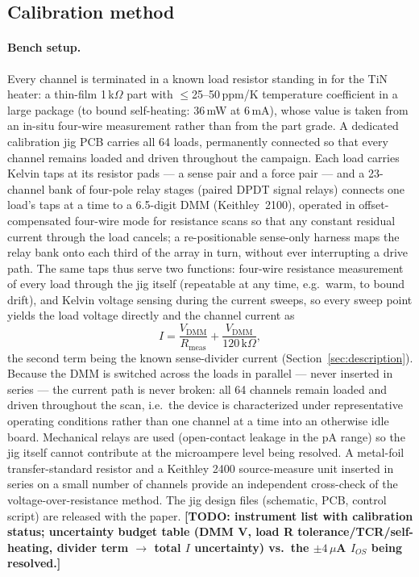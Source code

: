 \documentclass[11pt]{article}
\newif\ifdraft\drafttrue
\newcommand{\todo}[1]{\ifdraft{\color{red}\textbf{[TODO: #1]}}\fi}
\begin{document}
\subsection{Calibration method}
\label{sec:cal-method}

\paragraph{Bench setup.}
Every channel is terminated in a known load resistor standing in for the TiN
heater: a thin-film 1\,k$\Omega$ part with $\le$25--50\,ppm/K temperature
coefficient in a large package (to bound self-heating: 36\,mW at 6\,mA), whose
value is taken from an in-situ four-wire measurement rather than from the part
grade. A dedicated calibration jig PCB carries all 64 loads, permanently
connected so that every channel remains loaded and driven throughout the
campaign. Each load carries Kelvin taps at its resistor pads --- a sense pair
and a force pair --- and a 23-channel bank of four-pole relay stages (paired DPDT signal relays)
connects one load's taps at a time to a 6.5-digit DMM (Keithley~2100),
operated in offset-compensated four-wire mode for resistance scans so that
any constant residual current through the load cancels; a re-positionable
sense-only harness maps the relay bank onto each third of the array in turn,
without ever interrupting a drive path. The same taps thus serve two
functions: four-wire resistance measurement of every load through the jig
itself (repeatable at any time, e.g.\ warm, to bound drift), and Kelvin
voltage sensing during the current sweeps, so every sweep point yields the
load voltage directly and the channel current as
\[
  I = \frac{V_\text{DMM}}{R_\text{meas}} + \frac{V_\text{DMM}}{120\,\text{k}\Omega},
\]
the second term being the known sense-divider current
(Section~\ref{sec:description}). Because the DMM is switched across the loads
in parallel --- never inserted in series --- the current path is never broken:
all 64 channels remain loaded and driven throughout the scan, i.e.\ the device
is characterized under representative operating conditions rather than one
channel at a time into an otherwise idle board. Mechanical relays are used
(open-contact leakage in the pA range) so the jig itself cannot contribute at
the microampere level being resolved. A metal-foil transfer-standard resistor
and a Keithley 2400 source-measure unit inserted in series on a small number of
channels provide an independent cross-check of the voltage-over-resistance
method. The jig design files (schematic, PCB, control script) are released
with the paper. \todo{instrument list with calibration status; uncertainty
budget table (DMM V, load R tolerance/TCR/self-heating, divider term $\to$
total $I$ uncertainty) vs.\ the $\pm4\,\mu$A $I_{OS}$ being resolved.}
\end{document}
